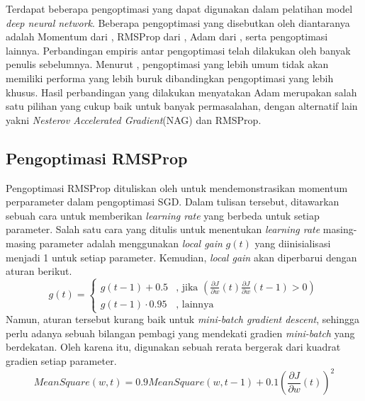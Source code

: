 Terdapat beberapa pengoptimasi yang dapat digunakan dalam pelatihan model \emph{deep neural network}. Beberapa pengoptimasi yang disebutkan oleh \textcite{Ruder2016} diantaranya adalah Momentum dari \textcite{qian1999momentum}, RMSProp dari \textcite{hinton2012neural}, Adam dari \textcite{ADAMKingma}, serta pengoptimasi lainnya. Perbandingan empiris antar pengoptimasi telah dilakukan oleh banyak penulis sebelumnya. Menurut \textcite{Choi2019}, pengoptimasi yang lebih umum tidak akan memiliki performa yang lebih buruk dibandingkan pengoptimasi yang lebih khusus. Hasil perbandingan yang dilakukan \textcite{benchmark2021schmidt} menyatakan Adam merupakan salah satu pilihan yang cukup baik untuk banyak permasalahan, dengan alternatif lain yakni \emph{Nesterov Accelerated Gradient}(NAG) dan RMSProp.

\subsection{Pengoptimasi RMSProp}
Pengoptimasi RMSProp dituliskan oleh \textcite{hinton2012neural} untuk mendemonstrasikan momentum perparameter dalam pengoptimasi SGD. Dalam tulisan tersebut, ditawarkan sebuah cara untuk memberikan \emph{learning rate} yang berbeda untuk setiap parameter. Salah satu cara yang ditulis untuk menentukan \emph{learning rate} masing-masing parameter adalah menggunakan \emph{local gain} $g(t)$ yang diinisialisasi menjadi 1 untuk setiap parameter. Kemudian, \emph{local gain} akan diperbarui dengan aturan berikut.
\begin{equation*}
  g(t) =
    \begin{cases}
      g(t-1) + 0.5 & \text{, jika } \left(
        \frac{\partial J}{\partial w}(t) \frac{\partial J}{\partial w}(t-1) > 0
      \right)\\
      g(t-1) \cdot 0.95 & \text{, lainnya}
    \end{cases}
\end{equation*}
Namun, aturan tersebut kurang baik untuk \emph{mini-batch gradient descent}, sehingga perlu adanya sebuah bilangan pembagi yang mendekati gradien \emph{mini-batch} yang berdekatan. Oleh karena itu, digunakan sebuah rerata bergerak dari kuadrat gradien setiap parameter.
$$
MeanSquare(w, t) = 0.9 MeanSquare(w, t-1) + 0.1\left(\frac{\partial J}{\partial w}(t)\right)^2
$$


